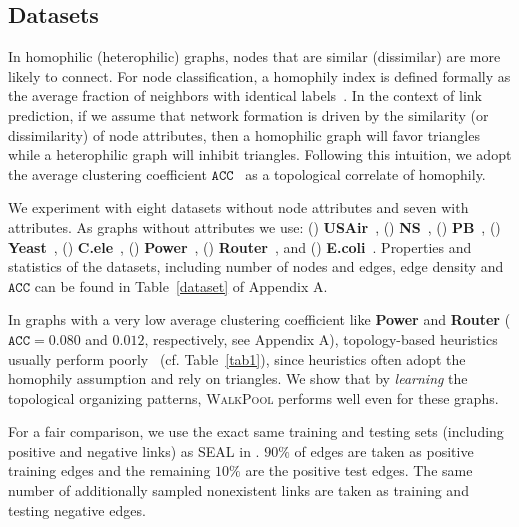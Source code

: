\documentclass[11pt]{article}
\newcommand{\walkpool}{\textsc{WalkPool}\xspace}
\newcommand{\UPDATE}[1]{\textcolor{WowColor}{{#1}}}
\renewcommand{\UPDATE}[1]{#1}
\begin{document}
\subsection{Datasets}
\vspace{-2mm}
In homophilic (heterophilic) graphs, nodes that are similar (dissimilar) are more likely to connect. For node classification, a homophily index is defined formally as the average fraction of neighbors with identical labels~\citep{pei2020geom}. In the context of link prediction, if we assume that network formation is driven by the similarity (or dissimilarity) of node attributes, then a homophilic graph will favor triangles while a heterophilic graph will inhibit triangles. Following this intuition, we adopt the average clustering coefficient $\mathtt{ACC}$~\citep{watts1998collective} as a topological correlate of homophily.

\UPDATE{We experiment with eight datasets without node attributes and seven with attributes. As graphs without attributes we use: (\romannumeral1) \textbf{USAir}~\citep{usair}, (\romannumeral2) \textbf{NS}~\citep{newman2006finding}, (\romannumeral3) \textbf{PB}~\citep{ackland2005mapping},  (\romannumeral4) \textbf{Yeast}~\citep{von2002comparative}, (\romannumeral5) \textbf{C.ele}~\citep{watts1998collective}, (\romannumeral6) \textbf{Power}~\citep{watts1998collective}, (\romannumeral7) \textbf{Router}~\citep{spring2002measuring}, and (\romannumeral8) \textbf{E.coli}~\citep{zhang2018beyond}. Properties and statistics of the datasets, including number of nodes and edges, edge density and $\mathtt{ACC}$ can be found in Table~\ref{dataset} of Appendix A.}

In graphs with a very low average clustering coefficient like \textbf{Power} and \textbf{Router} ($\mathtt{ACC}=0.080$ and $0.012$, respectively, see Appendix A), topology-based heuristics usually perform poorly~\citep{lu2011link} (cf. Table~\ref{tab1}), since heuristics often adopt the homophily assumption and rely on triangles. We show that by \textit{learning} the topological organizing patterns, \walkpool performs well even for these graphs. 

For a fair comparison, we use the exact same training and testing sets (including positive and negative links) as SEAL in \cite{zhang2018link}. $90\%$ of edges are taken as positive training edges and the remaining $10\%$ are the positive test edges. The same number of additionally sampled nonexistent links are taken as training and testing negative edges.
\end{document}
